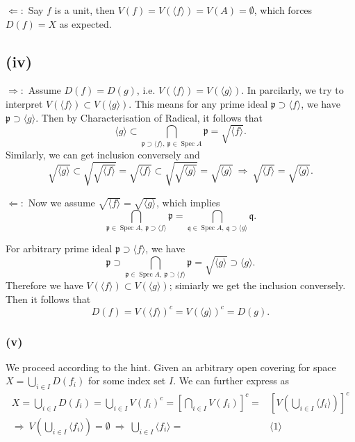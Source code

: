 $\Leftarrow:$ Say $f$ is a unit, then $V(f)=V(\langle f\rangle)=V(A)=\emptyset$, which forces $D(f)=X$ as expected. 

\subsection{(iv)}
$\Rightarrow:$ Assume $D(f)=D(g)$, i.e. $V(\langle f\rangle)=V(\langle g\rangle)$. In parcilarly, we try to interpret $V(\langle f\rangle)\subset V(\langle g\rangle)$. This means for any prime ideal $\mathfrak p\supset \langle f\rangle$, we have $\mathfrak p\supset \langle g\rangle$. Then by Characterisation of Radical, it follows that $$\langle g\rangle \subset \bigcap_{\mathfrak p\supset \langle f\rangle,~ \mathfrak p\in\operatorname{Spec}A}\mathfrak p= \sqrt{\langle f\rangle}.$$
Similarly, we can get inclusion conversely and 
$$\sqrt{\langle g\rangle}\subset \sqrt{\sqrt{\langle f\rangle}}=\sqrt{\langle f\rangle}\subset \sqrt{\sqrt{\langle g\rangle}}=\sqrt{\langle g\rangle} ~\Rightarrow~ \sqrt{\langle f\rangle}=\sqrt{\langle g\rangle}.$$

$\Leftarrow:$ Now we assume $\sqrt{\langle f\rangle}=\sqrt{\langle g\rangle}$, which implies 
$$\bigcap_{\mathfrak p\in\operatorname{Spec}A,~ \mathfrak p\supset \langle f\rangle}\mathfrak p=\bigcap_{\mathfrak q\in\operatorname{Spec}A,~ \mathfrak q\supset \langle g\rangle}\mathfrak q.$$

For arbitrary prime ideal $\mathfrak p\supset \langle f\rangle$, we have 
$$\mathfrak p\supset \bigcap_{\mathfrak p\in\operatorname{Spec}A,~ \mathfrak p\supset \langle f\rangle}\mathfrak p=\sqrt{\langle g\rangle}\supset \langle g\rangle.$$
Therefore we have $V(\langle f\rangle)\subset V(\langle g\rangle)$; simiarly we get the inclusion conversely. Then it follows that $$D(f)=V(\langle f\rangle)^c=V(\langle g\rangle)^c=D(g).$$
\subsubsection{(v)}
We proceed according to the hint. 
Given an arbitrary open covering for space $X=\bigcup_{i\in I}D(f_i)$ for some index set $I$. 
We can further express as \begin{align*}
    X = \bigcup_{i\in I}D(f_i)
    = \bigcup_{i\in I} V(f_i)^c
    = \left[\bigcap_{i\in I} V(f_i)\right]^c
    =& \left[V\left(\bigcup_{i\in I}\langle f_i\rangle\right)\right]^c\\
    \Rightarrow~ V\left(\bigcup_{i\in I}\langle f_i\rangle\right)=\emptyset 
    ~\Rightarrow~ \bigcup_{i\in I}\langle f_i\rangle=&\langle 1\rangle
\end{align*}  

